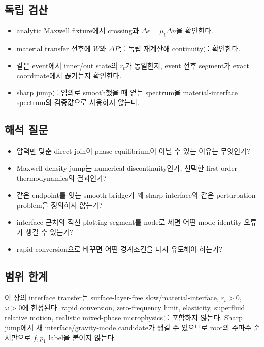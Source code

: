 \documentclass[
  10pt,
  a4paper,
]{article}
\providecommand{\tightlist}{%
  \setlength{\itemsep}{0pt}\setlength{\parskip}{0pt}}
\begin{document}
\subsection{독립 검산}\label{uxb3c5uxb9bd-uxac80uxc0b0-1}

\begin{itemize}
\tightlist
\item
  analytic Maxwell fixture에서 crossing과
  \(\Delta\epsilon=\mu_t\Delta n\)을 확인한다.
\item
  material transfer 전후에 \(W\)와 \(\Delta P\)를 독립 재계산해
  continuity를 확인한다.
\item
  같은 event에서 inner/out state의 \(r_t\)가 동일한지, event 전후
  segment가 exact coordinate에서 끊기는지 확인한다.
\item
  sharp jump를 임의로 smooth했을 때 얻는 spectrum을 material-interface
  spectrum의 검증값으로 사용하지 않는다.
\end{itemize}

\subsection{해석 질문}\label{uxd574uxc11d-uxc9c8uxbb38-1}

\begin{itemize}
\tightlist
\item
  압력만 맞춘 direct join이 phase equilibrium이 아닐 수 있는 이유는
  무엇인가?
\item
  Maxwell density jump는 numerical discontinuity인가, 선택한 first-order
  thermodynamics의 결과인가?
\item
  같은 endpoint를 잇는 smooth bridge가 왜 sharp interface와 같은
  perturbation problem을 정의하지 않는가?
\item
  interface 근처의 직선 plotting segment를 node로 세면 어떤
  mode-identity 오류가 생길 수 있는가?
\item
  rapid conversion으로 바꾸면 어떤 경계조건을 다시 유도해야 하는가?
\end{itemize}

\subsection{범위 한계}\label{uxbc94uxc704-uxd55cuxacc4-1}

이 장의 interface transfer는 surface-layer-free slow/material-interface,
\(r_t>0\), \(\omega>0\)에 한정된다. rapid conversion, zero-frequency
limit, elasticity, superfluid relative motion, realistic mixed-phase
microphysics를 포함하지 않는다. Sharp jump에서 새 interface/gravity-mode
candidate가 생길 수 있으므로 root의 주파수 순서만으로 \(f,p_1\) label을
붙이지 않는다.
\end{document}
